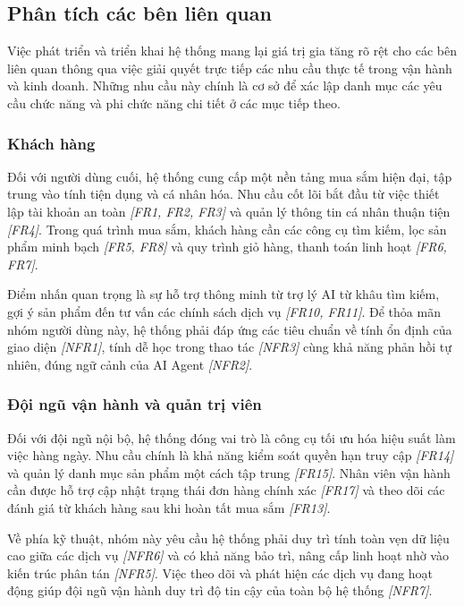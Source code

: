\subsection{Phân tích các bên liên quan}

Việc phát triển và triển khai hệ thống mang lại giá trị gia tăng rõ rệt cho các bên liên quan thông qua việc giải quyết trực tiếp các nhu cầu thực tế trong vận hành và kinh doanh. Những nhu cầu này chính là cơ sở để xác lập danh mục các yêu cầu chức năng và phi chức năng chi tiết ở các mục tiếp theo.

\subsubsection{Khách hàng}

Đối với người dùng cuối, hệ thống cung cấp một nền tảng mua sắm hiện đại, tập trung vào tính tiện dụng và cá nhân hóa. Nhu cầu cốt lõi bắt đầu từ việc thiết lập tài khoản an toàn \textit{[FR1, FR2, FR3]} và quản lý thông tin cá nhân thuận tiện \textit{[FR4]}. Trong quá trình mua sắm, khách hàng cần các công cụ tìm kiếm, lọc sản phẩm minh bạch \textit{[FR5, FR8]} và quy trình giỏ hàng, thanh toán linh hoạt \textit{[FR6, FR7]}.

Điểm nhấn quan trọng là sự hỗ trợ thông minh từ trợ lý AI từ khâu tìm kiếm, gợi ý sản phẩm đến tư vấn các chính sách dịch vụ \textit{[FR10, FR11]}. Để thỏa mãn nhóm người dùng này, hệ thống phải đáp ứng các tiêu chuẩn về tính ổn định của giao diện \textit{[NFR1]}, tính dễ học trong thao tác \textit{[NFR3]} cùng khả năng phản hồi tự nhiên, đúng ngữ cảnh của AI Agent \textit{[NFR2]}.

\subsubsection{Đội ngũ vận hành và quản trị viên}

Đối với đội ngũ nội bộ, hệ thống đóng vai trò là công cụ tối ưu hóa hiệu suất làm việc hàng ngày. Nhu cầu chính là khả năng kiểm soát quyền hạn truy cập \textit{[FR14]} và quản lý danh mục sản phẩm một cách tập trung \textit{[FR15]}. Nhân viên vận hành cần được hỗ trợ cập nhật trạng thái đơn hàng chính xác \textit{[FR17]} và theo dõi các đánh giá từ khách hàng sau khi hoàn tất mua sắm \textit{[FR13]}.

Về phía kỹ thuật, nhóm này yêu cầu hệ thống phải duy trì tính toàn vẹn dữ liệu cao giữa các dịch vụ \textit{[NFR6]} và có khả năng bảo trì, nâng cấp linh hoạt nhờ vào kiến trúc phân tán \textit{[NFR5]}. Việc theo dõi và phát hiện các dịch vụ đang hoạt động giúp đội ngũ vận hành duy trì độ tin cậy của toàn bộ hệ thống \textit{[NFR7]}.

